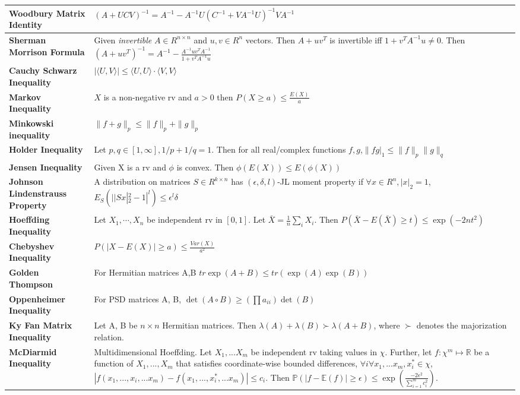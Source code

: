\documentclass[11pt]{article}
\begin{document}
\begin{longtable}{|>{\raggedright}m{4.5cm}|m{13cm}|} \hline
\textbf{Woodbury Matrix Identity} & $(A+UCV)^{-1} = A^{-1} - A^{-1}U(C^{-1}+VA^{-1}U)^{-1}VA^{-1}$\\ \hline
\textbf{Sherman Morrison Formula} & Given \textit{invertible} $A \in R^{n\times n}$ and $u,v\in R^n$ vectors. Then $A+uv^T$ is invertible iff $1+v^TA^{-1}u \neq 0$. Then $(A+uv^T)^{-1} = A^{-1}-\frac{A^{-1}uv^TA^{-1}}{1+v^TA^{-1}u}$\\ \hline
\textbf{Cauchy Schwarz Inequality} & $ |\langle U, V \rangle| \leq \langle U, U\rangle \cdot \langle V, V\rangle $\\ \hline
\textbf{Markov Inequality} & $X$ is a non-negative rv and $a>0$ then $P(X \geq a) \leq \frac{E(X)}{a}$\\ \hline
\textbf{Minkowski inequality} & $\|f+g\|_p \leq \|f\|_p + \| g\|_p$\\ \hline
\textbf{Holder Inequality} & Let $p,q\in [1, \infty], 1/p+1/q=1$. Then for all real/complex functions $f,g$,$\|fg|_1 \leq \|f\|_p\|g\|_q$\\ \hline
\textbf{Jensen Inequality} & Given X is a rv and $\phi$ is convex. Then $\phi(E(X)) \leq E(\phi(X))$\\ \hline
\textbf{Johnson Lindenstrauss Property} & A distribution on matrices $S\in R^{k \times n}$ has $(\epsilon, \delta, l)$-JL moment property if $\forall x\in R^n, |x|_2=1$, $E_S(||Sx|^2_2-1|^l)\leq \epsilon^l\delta$\\ \hline
\textbf{Hoeffding Inequality} & Let $X_1,\cdots,X_n$ be independent rv in $[0,1]$. Let $\bar{X} = \frac{1}{n}\sum_i{X_i}$. Then $P(\bar{X}-E(\bar{X})\geq t) \leq \exp(-2nt^2)$ \\ \hline
\textbf{Chebyshev Inequality} & $P(|X-E(X)| \geq a) \leq \frac{Var(X)}{a^2}$\\ \hline
\textbf{Golden Thompson} & For Hermitian matrices A,B $tr \exp(A+B) \leq tr(\exp(A)\exp(B))$\\ \hline
\textbf{Oppenheimer Inequality} & For PSD matrices A, B, $\det(A \circ B) \ge \left( \prod a_{ii} \right) \det(B)$\\ \hline
\textbf{Ky Fan Matrix Inequality} & Let A, B be $n \times n$ Hermitian matrices. Then $\lambda(A) + \lambda(B) \succ \lambda(A+B)$, where $\succ$ denotes the majorization relation.\\ \hline
\textbf{McDiarmid Inequality} & Multidimensional Hoeffding. Let $X_1,...X_m$ be independent rv taking values in $\chi$. Further, let $f: \chi^m \mapsto \mathbb{R}$ be a function of $X_1,...,X_m$ that satisfies coordinate-wise bounded differences, $\forall i \forall x_1,...x_m,x_i^* \in \chi$, $\left| f(x_1, ... , x_i, ... x_m) - f(x_1,...,x_i^*, ...x_m) \right| \leq c_i$. Then $\mathbb{P}(|f - \mathbb{E}(f)| \geq \epsilon) \leq \exp\left(  \frac{-2\epsilon^2}{\sum_{i=1}^{m}c_i^2} \right)$.\\ \hline

\end{longtable}
\end{document}
